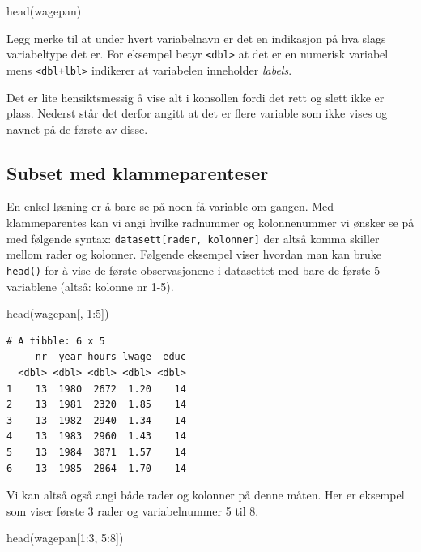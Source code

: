 \documentclass[
  norsk,
  letterpaper,
  DIV=11,
  numbers=noendperiod]{scrreprt}
\newenvironment{Shaded}{\begin{snugshade}}{\end{snugshade}}
\newcommand{\DecValTok}[1]{\textcolor[rgb]{0.68,0.00,0.00}{#1}}
\newcommand{\FunctionTok}[1]{\textcolor[rgb]{0.28,0.35,0.67}{#1}}
\newcommand{\NormalTok}[1]{\textcolor[rgb]{0.00,0.23,0.31}{#1}}
\newcommand{\SpecialCharTok}[1]{\textcolor[rgb]{0.37,0.37,0.37}{#1}}
\theoremstyle{definition}
\theoremstyle{remark}
\begin{document}
\begin{Shaded}
\begin{Highlighting}[]
\FunctionTok{head}\NormalTok{(wagepan)}
\end{Highlighting}
\end{Shaded}

Legg merke til at under hvert variabelnavn er det en indikasjon på hva
slags variabeltype det er. For eksempel betyr
\texttt{\textless{}dbl\textgreater{}} at det er en numerisk variabel
mens \texttt{\textless{}dbl+lbl\textgreater{}} indikerer at variabelen
inneholder \emph{labels}.

Det er lite hensiktsmessig å vise alt i konsollen fordi det rett og
slett ikke er plass. Nederst står det derfor angitt at det er flere
variable som ikke vises og navnet på de første av disse.

\subsection{Subset med
klammeparenteser}\label{subset-med-klammeparenteser}

En enkel løsning er å bare se på noen få variable om gangen. Med
klammeparentes kan vi angi hvilke radnummer og kolonnenummer vi ønsker
se på med følgende syntax: \texttt{datasett{[}rader,\ kolonner{]}} der
altså komma skiller mellom rader og kolonner. Følgende eksempel viser
hvordan man kan bruke \texttt{head()} for å vise de første
observasjonene i datasettet med bare de første 5 variablene (altså:
kolonne nr 1-5).

\begin{Shaded}
\begin{Highlighting}[]
\FunctionTok{head}\NormalTok{(wagepan[, }\DecValTok{1}\SpecialCharTok{:}\DecValTok{5}\NormalTok{])}
\end{Highlighting}
\end{Shaded}

\begin{verbatim}
# A tibble: 6 x 5
     nr  year hours lwage  educ
  <dbl> <dbl> <dbl> <dbl> <dbl>
1    13  1980  2672  1.20    14
2    13  1981  2320  1.85    14
3    13  1982  2940  1.34    14
4    13  1983  2960  1.43    14
5    13  1984  3071  1.57    14
6    13  1985  2864  1.70    14
\end{verbatim}

Vi kan altså også angi både rader og kolonner på denne måten. Her er
eksempel som viser første 3 rader og variabelnummer 5 til 8.

\begin{Shaded}
\begin{Highlighting}[]
\FunctionTok{head}\NormalTok{(wagepan[}\DecValTok{1}\SpecialCharTok{:}\DecValTok{3}\NormalTok{, }\DecValTok{5}\SpecialCharTok{:}\DecValTok{8}\NormalTok{])}
\end{Highlighting}
\end{Shaded}
\end{document}
